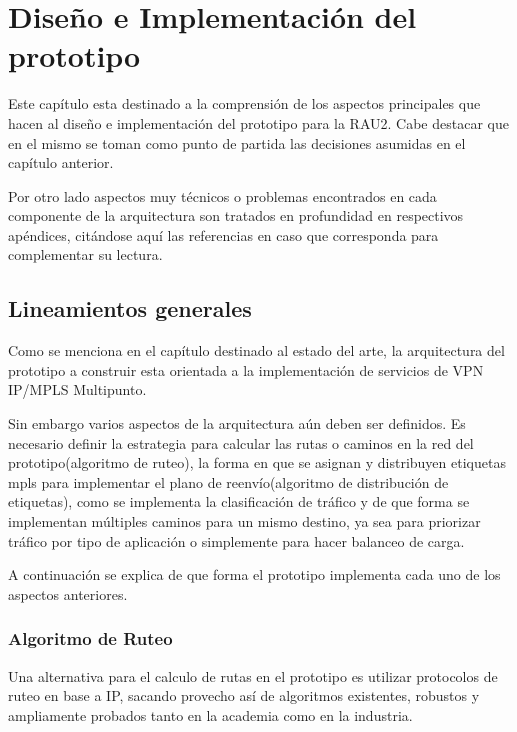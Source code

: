 \chapter{Dise\~no e Implementaci\'on del prototipo}

\ifpdf
    \graphicspath{{Chapter4/Figs/Raster/}{Chapter4/Figs/PDF/}{Chapter4/Figs/}}
\else
    \graphicspath{{Chapter4/Figs/Vector/}{Chapter4/Figs/}}
\fi

Este cap\'itulo esta destinado a la comprensi\'on de los aspectos principales que hacen al dise\~no e implementaci\'on del prototipo para la RAU2. Cabe destacar que en el mismo se toman como punto de partida las decisiones asumidas en el cap\'itulo anterior.

Por otro lado aspectos muy t\'ecnicos o problemas encontrados en cada componente de la arquitectura son tratados en profundidad en respectivos ap\'endices, citándose aquí las referencias en caso que corresponda para complementar su lectura.\\

\section[Lineamientos generales]{Lineamientos generales}

Como se menciona en el cap\'itulo destinado al estado del arte, la arquitectura del prototipo a construir esta orientada a la implementaci\'on de servicios de VPN IP/MPLS Multipunto.

Sin embargo varios aspectos de la arquitectura a\'un deben ser definidos. Es necesario definir la estrategia para calcular las rutas o caminos en la red del prototipo(algoritmo de ruteo), la forma en que se asignan y distribuyen etiquetas mpls para implementar el plano de reenvío(algoritmo de distribución de etiquetas), como se implementa la clasificaci\'on de tr\'afico y de que forma se implementan múltiples caminos para un mismo destino, ya sea para priorizar tr\'afico por tipo de aplicaci\'on o simplemente para hacer balanceo de carga. 

A continuaci\'on se explica de que forma el prototipo implementa cada uno de los aspectos anteriores.

\subsection{Algoritmo de Ruteo}

Una alternativa para el calculo de rutas en el prototipo es utilizar protocolos de ruteo en base a IP, sacando provecho as\'i de algoritmos existentes, robustos y ampliamente probados tanto en la academia como en la industria.\\

